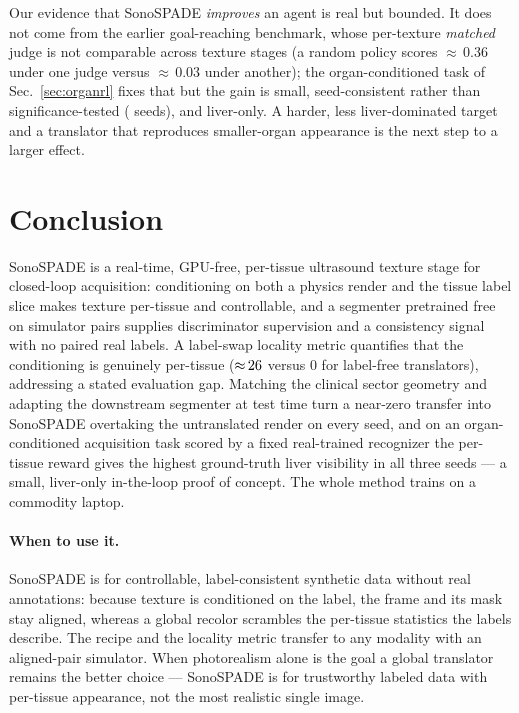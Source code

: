 \documentclass[runningheads]{llncs}
\begin{document}
Our evidence that SonoSPADE \emph{improves} an agent is real but bounded. It does not come from the
earlier goal-reaching benchmark, whose per-texture \emph{matched} judge is not comparable across texture
stages (a random policy scores ${\approx}\,0.36$ under one judge versus ${\approx}\,0.03$ under another);
the organ-conditioned task of Sec.~\ref{sec:organrl} fixes that but the gain is small, seed-consistent
rather than significance-tested (\rlSeeds{} seeds), and liver-only. A harder, less liver-dominated
target and a translator that reproduces smaller-organ appearance is the next step to a larger effect.

\section{Conclusion}
SonoSPADE is a real-time, GPU-free, per-tissue ultrasound texture stage for closed-loop acquisition:
conditioning on both a physics render and the tissue label slice makes texture per-tissue and
controllable, and a segmenter pretrained free on simulator pairs supplies discriminator supervision and
a consistency signal with no paired real labels. A label-swap locality metric quantifies that the
conditioning is genuinely per-tissue (${\approx}\,26$ versus $0$ for label-free translators),
addressing a stated evaluation gap. Matching the clinical sector geometry and adapting the downstream
segmenter at test time turn a near-zero transfer into SonoSPADE overtaking the untranslated render on
every seed, and on an organ-conditioned acquisition task scored by a fixed real-trained recognizer the
per-tissue reward gives the highest ground-truth liver visibility in all three seeds --- a small,
liver-only in-the-loop proof of concept. The whole method trains on a commodity laptop.

\paragraph{When to use it.} SonoSPADE is for controllable, label-consistent synthetic data without real
annotations: because texture is conditioned on the label, the frame and its mask stay aligned, whereas a
global recolor scrambles the per-tissue statistics the labels describe. The recipe and the locality
metric transfer to any modality with an aligned-pair simulator. When photorealism alone is the goal a
global translator remains the better choice --- SonoSPADE is for trustworthy labeled data with
per-tissue appearance, not the most realistic single image.
\end{document}
